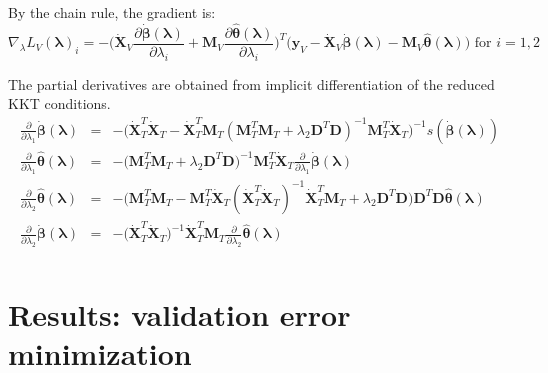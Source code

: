 \documentclass[10pt,letterpaper]{article}
\begin{document}
By the chain rule, the gradient is:
\begin{equation}
\nabla_\lambda L_V(\boldsymbol{\lambda})_i =
- \bigg(
\dot{\boldsymbol{X}}_V \frac{\partial \dot{\boldsymbol{\beta}}(\boldsymbol{\lambda})}{\partial \lambda_i}
+ \boldsymbol{M}_V \frac{\partial \hat{\boldsymbol{\theta}}(\boldsymbol{\lambda})}{\partial \lambda_i}
\bigg )^T
\bigg (
\boldsymbol{y}_V
- \dot{\boldsymbol{X}}_V \dot{\boldsymbol{\beta}}(\boldsymbol{\lambda})
- \boldsymbol{M}_V\hat{\boldsymbol{\theta}}(\boldsymbol{\lambda})
\bigg )
\text{ for } i = 1,2 
\end{equation}

The partial derivatives are obtained from implicit differentiation of the reduced KKT conditions.
\begin{equation}
\begin{array}{lcl}
\frac{\partial}{\partial \lambda_1} \dot{\boldsymbol{\beta}}(\boldsymbol{\lambda})  &=&
-\bigg(\dot{\boldsymbol{X}}_T^T \dot{\boldsymbol{X}}_T
- \dot{\boldsymbol{X}}_T^T \boldsymbol{M}_T(\boldsymbol{M}_T^T \boldsymbol{M}_T
+ \lambda_2 \boldsymbol{D}^T\boldsymbol{D})^{-1} \boldsymbol{M}_T^T \dot{\boldsymbol{X}}_T \bigg)^{-1} 
s( \dot{\boldsymbol{\beta}}(\boldsymbol{\lambda})) \\
\frac{\partial }{\partial \lambda_1} \hat{\boldsymbol{\theta}}(\boldsymbol{\lambda}) &=&
-\bigg(\boldsymbol{M}_T^T \boldsymbol{M}_T
+ \lambda_2 \boldsymbol{D}^T \boldsymbol{D}\bigg)^{-1}
\boldsymbol{M}_T^T \dot{\boldsymbol{X}}_T \frac{\partial}{\partial \lambda_1} \dot{\boldsymbol{\beta}}(\boldsymbol{\lambda})
\\
\frac{\partial}{\partial \lambda_2}  \hat{\boldsymbol{\theta}}(\boldsymbol{\lambda}) &=&
-\bigg(\boldsymbol{M}_T^T \boldsymbol{M}_T
- \boldsymbol{M}_T^T \dot{\boldsymbol{X}}_T (\dot{\boldsymbol{X}}_T^T\dot{\boldsymbol{X}}_T)^{-1} \dot{\boldsymbol{X}}_T^T \boldsymbol{M}_T + \lambda_2 \boldsymbol{D}^T\boldsymbol{D} \bigg)
\boldsymbol{D}^T\boldsymbol{D} \hat{\boldsymbol{\theta}}(\boldsymbol{\lambda})
\\
\frac{\partial}{\partial \lambda_2} \dot{\boldsymbol{\beta}}(\boldsymbol{\lambda}) &=&
- \bigg( \dot{\boldsymbol{X}}_T^T\dot{\boldsymbol{X}}_T\bigg)^{-1}
\dot{\boldsymbol{X}}_T^T \boldsymbol{M}_T
\frac{\partial}{\partial \lambda_2}  \hat{\boldsymbol{\theta}}(\boldsymbol{\lambda})\\
\end{array}
\end{equation}


\section{Results: validation error minimization}
\end{document}
